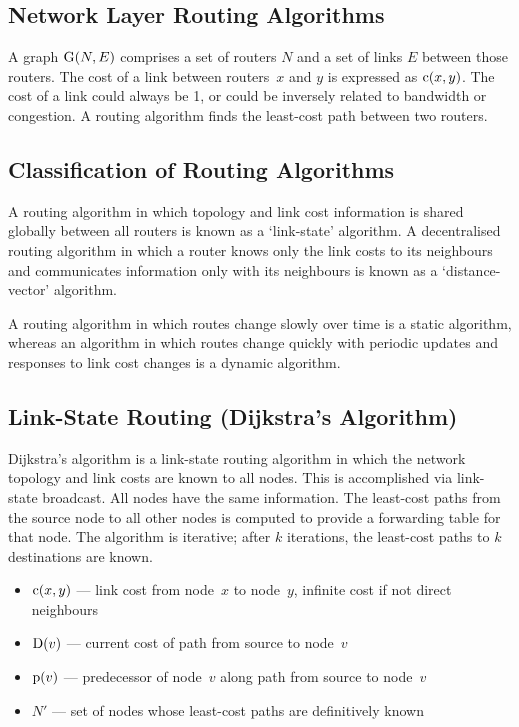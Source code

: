 \subsection{Network Layer Routing Algorithms}

A graph \(\textup{G}\!\left( N, E \right)\) comprises a set of routers \(N\) and a set of links \(E\) between those routers.
The cost of a link between routers~\(x\) and \(y\) is expressed as \(\textup{c}\!\left( x, y \right)\).
The cost of a link could always be \num{1}, or could be inversely related to bandwidth or congestion.
A routing algorithm finds the least-cost path between two routers.

\subsection{Classification of Routing Algorithms}

A routing algorithm in which topology and link cost information is shared globally between all routers is known as a `link-state' algorithm.
A decentralised routing algorithm in which a router knows only the link costs to its neighbours and communicates information only with its neighbours is known as a `distance-vector' algorithm.

A routing algorithm in which routes change slowly over time is a static algorithm, whereas an algorithm in which routes change quickly with periodic updates and responses to link cost changes is a dynamic algorithm.

\subsection{Link-State Routing (Dijkstra's Algorithm)}

Dijkstra's algorithm is a link-state routing algorithm in which the network topology and link costs are known to all nodes.
This is accomplished via link-state broadcast.
All nodes have the same information.
The least-cost paths from the source node to all other nodes is computed to provide a forwarding table for that node.
The algorithm is iterative; after \(k\) iterations, the least-cost paths to \(k\) destinations are known.

\begin{itemize}
  \item \(\textup{c}\!\left( x, y \right)\) --- link cost from node~\(x\) to node~\(y\), infinite cost if not direct neighbours
  \item \(\textup{D}\!\left( v \right)\) --- current cost of path from source to node~\(v\)
  \item \(\textup{p}\!\left( v \right)\) --- predecessor of node~\(v\) along path from source to node~\(v\)
  \item \(N'\) --- set of nodes whose least-cost paths are definitively known
\end{itemize}

